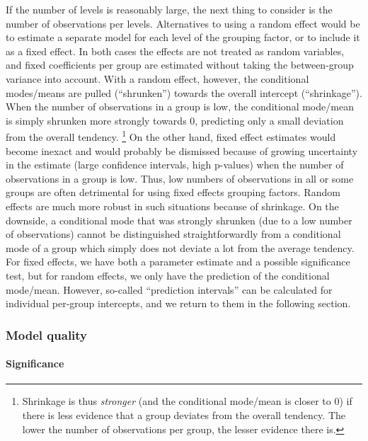 If the number of levels is reasonably large, the next thing to consider is the number of observations per levels.
Alternatives to using a random effect would be to estimate a separate model for each level of the grouping factor, or to include it as a fixed effect.
In both cases the effects are not treated as random variables, and fixed coefficients per group are estimated without taking the between-group variance into account.
With a random effect, however, the conditional modes\slash means are pulled (``shrunken'') towards the overall intercept (``shrinkage'').
When the number of observations in a group is low, the conditional mode\slash mean is simply shrunken more strongly towards $0$, predicting only a small deviation from the overall tendency.%
\footnote{Shrinkage is thus \textit{stronger} (and the conditional mode\slash mean is closer to $0$) if there is less evidence that a group deviates from the overall tendency.
The lower the number of observations per group, the lesser evidence there is.}
On the other hand, fixed effect estimates would become inexact and would probably be dismissed because of growing uncertainty in the estimate (large confidence intervals, high p-values) when the number of observations in a group is low.
Thus, low numbers of observations in all or some groups are often detrimental for using fixed effects grouping factors.
Random effects are much more robust in such situations because of shrinkage.
On the downside, a conditional mode that was strongly shrunken (due to a low number of observations) cannot be distinguished straightforwardly from a conditional mode of a group which simply does not deviate a lot from the average tendency.
For fixed effects, we have both a parameter estimate and a possible significance test, but for random effects, we only have the prediction of the conditional mode\slash mean.
However, so-called ``prediction intervals'' can be calculated for individual per-group intercepts, and we return to them in the following section.


\subsubsection{Model quality}
\label{sec:significancetestingandcoefficientsofdetermination}

\paragraph{Significance}

